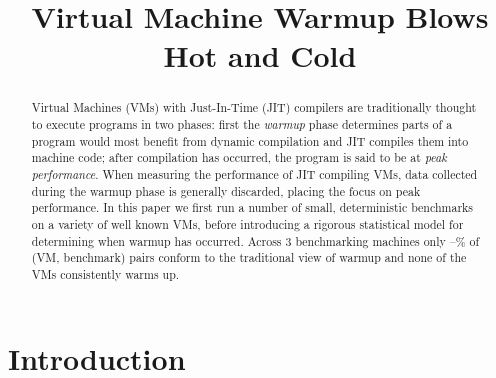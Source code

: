 \documentclass[preprint,numbers,10pt]{sigplanconf}
\begin{document}
\title{Virtual Machine Warmup Blows Hot and Cold}



\maketitle

%
%
%

\begin{abstract}
Virtual Machines (VMs) with Just-In-Time (JIT) compilers are traditionally thought
to execute programs in two phases: first the \emph{warmup} phase determines
parts of a program would most benefit from dynamic compilation and JIT
compiles them into machine code; after
compilation has occurred, the program is said to be at \emph{peak performance}.
When measuring the performance of JIT compiling VMs, data collected
during the warmup phase is generally discarded, placing the focus on peak
performance. In this paper we first run a number of small,
deterministic benchmarks on a variety of well known VMs, before introducing
a rigorous statistical model for determining when warmup has occurred.
Across 3 benchmarking machines only \mintwo--\maxtwo\% of (VM, benchmark) pairs conform to
the traditional view of warmup and none of the
VMs consistently warms up.
\end{abstract}

\section{Introduction}
\label{sec:intro}
\end{document}
